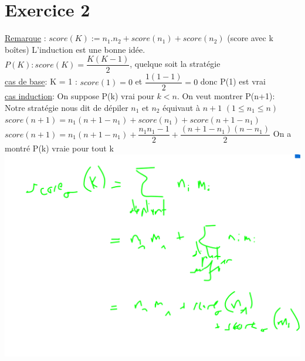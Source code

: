 \documentclass[a4paper, draft]{article}
\begin{document}
\section*{Exercice 2}
\underline{Remarque} : $score(K) := n_{1}.n_{2} + score(n_{1} )+ score(n_{2})$ (score avec k boîtes) L'induction est une bonne idée.\\
$P(K) : score(K) = \dfrac{K(K-1)}{2}$, quelque soit la stratégie\\

\underline{cas de base}: K = 1 : $score(1)=0$ et $\dfrac{1(1-1)}{2}=0$ donc P(1) est vrai\\

\underline{cas induction}: On suppose P(k) vrai pour $k<n$. On veut montrer P(n+1):\\
Notre stratégie nous dit de dépiler $n_{1}$ et $n_{2 }$ équivaut à $ n+1$  $(1 \leq n_1 \leq n)$ \\
$score(n+1) = n_{1}(n+1-n_{1}) + score(n_{1}) + score (n+1-n_{1})$ \\
$score(n+1)=n_{1}(n+1-n_{1}) + \dfrac{n_{1}n_{1}-1}{2} + \dfrac{(n+1-n_{1})(n-n_{1})}{2}$
On a montré P(k) vraie pour tout k\\
\includegraphics[scale = 0.3]{ex2}
\end{document}

